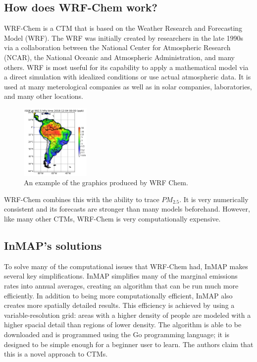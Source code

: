 \documentclass{article}
\begin{document}
\subsection{How does WRF-Chem work?}

WRF-Chem is a CTM that is based on the Weather Research and Forecasting Model (WRF). The WRF was initially created by
researchers in the late 1990s via a collaboration between the National Center for Atmospheric Research (NCAR), 
the National Oceanic and Atmospheric Administration, and many others. WRF is most useful for its capability to 
apply a mathematical model via a direct simulation with idealized conditions or use actual atmospheric data.
It is used at many meterological companies as well as in solar companies, laboratories, and many other locations.

\begin{figure}[h]
    \centering
    \includegraphics[width=0.3\textwidth]{wrfchem.png}
    \caption{An example of the graphics produced by WRF Chem.}
    \label{fig:atmospheric_box_model}
 \end{figure}

WRF-Chem combines this with the ability to trace $PM_{2.5}$. It is very numerically consistent and its forecasts are 
stronger than many models beforehand. However, like many other CTMs, WRF-Chem is very computationally expensive. 

\subsection{InMAP's solutions}

To solve many of the computational issues that WRF-Chem had, InMAP makes several key simplifications. InMAP simplifies many of the 
marginal emissions rates into annual averages, creating an algorithm that can be run much more efficiently. In addition to being more
computationally efficient, InMAP also creates more spatially detailed results. This efficiency is achieved by using a variable-resolution grid:
areas with a higher density of people are modeled with a higher spacial detail than regions of lower density. The algorithm is able to be downloaded
and is programmed using the Go programming language; it is designed to be simple enough for a beginner user to learn. The authors claim that this is a
novel approach to CTMs.
\end{document}
